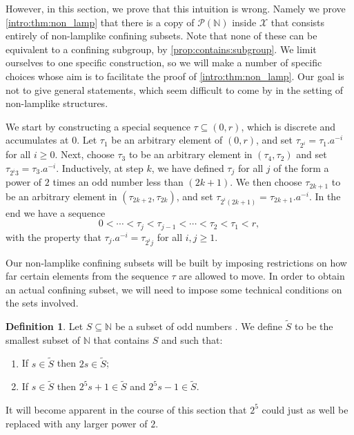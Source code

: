 \documentclass[reqno,12pt]{amsart}\setcounter{tocdepth}{1}
\theoremstyle{definition}
\newtheorem{definition}[theorem]{Definition}
\newcommand{\N}{\mathbb{N}}
\newcommand{\X}{\mathcal{X}}
\numberwithin{equation}{section}
\begin{document}
However, in this section, we prove that this intuition is wrong. Namely we prove \cref{intro:thm:non_lamp} that there is a copy of $\mathcal{P}(\N)$ inside $\X$ that consists entirely of non-lamplike confining subsets. Note that none of these can be equivalent to a confining subgroup, by \cref{prop:contains:subgroup}. We limit ourselves to one specific construction, so we will make a number of specific choices whose aim is to facilitate the proof of \cref{intro:thm:non_lamp}. Our goal is not to give general statements, which seem difficult to come by in the setting of non-lamplike structures.

\medskip

We start by constructing a special sequence $\tau \subseteq (0, r)$, which is discrete and accumulates at $0$. Let $\tau_1$ be an arbitrary element of $(0, r)$, and set $\tau_{2^i} = \tau_1.a^{-i}$ for all $i \geq 0$. Next, choose $\tau_3$ to be an arbitrary element in $(\tau_4, \tau_2)$ and set $\tau_{2^i 3} = \tau_3.a^{-i}$. Inductively, at step $k$, we have defined $\tau_j$ for all $j$ of the form a power of $2$ times an odd number less than $(2k+1)$. We then choose $\tau_{2k+1}$ to be an arbitrary element in $(\tau_{2k+2}, \tau_{2k})$, and set $\tau_{2^i (2k+1)} = \tau_{2k+1}.a^{-i}$.
In the end we have a sequence
\[0 < \cdots < \tau_j < \tau_{j-1} < \cdots < \tau_2 < \tau_1 <  r,\]
with the property that $\tau_j.a^{-i} = \tau_{2^i j}$ for all $i, j \geq 1$.

Our non-lamplike confining subsets will be built by imposing restrictions on how far certain elements from the sequence $\tau$ are allowed to move. In order to obtain an actual confining subset, we will need to impose some technical conditions on the sets involved.

\begin{definition}
\label{def:Stilde}
    Let $S \subseteq \N$ be a subset of odd numbers . We define $\widetilde{S}$ to be the smallest subset of $\N$ that contains $S$ and such that:
    \begin{enumerate}
        \item If $s \in \widetilde{S}$ then $2s \in \widetilde{S}$;
        \item If $s \in \widetilde{S}$ then $2^5 s + 1 \in \widetilde{S}$ and $2^5 s - 1 \in \widetilde{S}$.
    \end{enumerate}
\end{definition}

It will become apparent in the course of this section that $2^5$ could just as well be replaced with any larger power of $2$.
\end{document}
